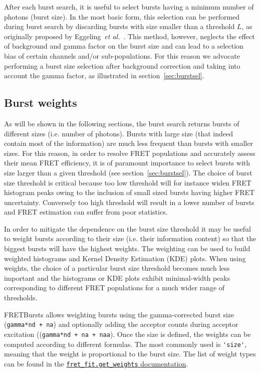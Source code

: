 After each burst search, it is useful to select
bursts having a minimum number of photons (burst size). In the most
basic form, this selection can be performed during burst search by discarding
bursts with size smaller than a threshold $L$, as originally proposed by 
Eggeling~\textit{et al.}~\cite{Eggeling_1998}. 
This method, however, neglects the effect
of background and gamma factor on the burst size and can lead to a selection
bias of certain channels and/or sub-populations. 
For this reason we advocate performing a burst size selection after background
correction and taking into account the gamma factor, as illustrated in
section~\ref{sec:burstsel}.


\subsection{Burst weights}

As will be shown in the following sections, the burst search returns bursts of different sizes (i.e. number of photons). 
Bursts with large size (that indeed contain most of the information) 
are much less frequent than bursts with smaller sizes. For this reason, in order 
to resolve FRET populations and accurately assess their mean FRET efficiency, it is of
paramount importance to select bursts with size larger than a given threshold (see 
section~\ref{sec:burstsel}). The choice of burst size threshold is 
critical because too low threshold will for instance widen FRET histogram peaks owing to the 
inclusion of small sized bursts having higher FRET uncertainty. Conversely 
too high threshold will result in a lower number of bursts and FRET estimation 
can suffer from poor statistics.

In order to mitigate the dependence on the burst size threshold it may be 
useful to weight bursts according to their size (i.e. their 
information content) so that the biggest bursts will have the highest weights. 
The weighting can be used to build weighted histograms and Kernel Density Estimation (KDE) plots.
When using weights, the choice of a particular burst size threshold becomes 
much less important and the histograms or KDE plots exhibit minimal-width
peaks corresponding to different FRET populations for a much wider range
of thresholds. 

FRETBursts allows weighting bursts using the gamma-corrected burst size
(\verb|gamma*nd + na|) and optionally adding the acceptor counts during
acceptor excitation ((\verb|gamma*nd + na + naa|). Once the size is defined, the weights
can be computed according to different formulas. The most
commonly used is \verb|'size'|, meaning that the weight 
is proportional to the burst size. The list of weight types
can be found in the 
\href{http://fretbursts.readthedocs.org/en/latest/fret_fit.html#fretbursts.fret_fit.get_weights}{\texttt{fret\_fit.get\_weights} documentation}.

